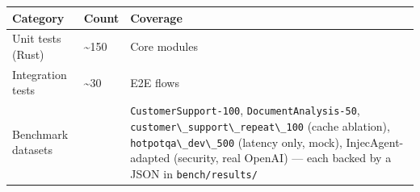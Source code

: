 \documentclass[
]{article}
\newcommand{\passthrough}[1]{#1}
\newcounter{none} %
\begin{document}
{\def\LTcaptype{none} %
\begin{longtable}[]{@{}
  >{\raggedright\arraybackslash}p{}
  >{\raggedright\arraybackslash}p{}
  >{\raggedright\arraybackslash}p{}@{}}
\toprule\noalign{}
\begin{minipage}[b]{\linewidth}\raggedright
Category
\end{minipage} & \begin{minipage}[b]{\linewidth}\raggedright
Count
\end{minipage} & \begin{minipage}[b]{\linewidth}\raggedright
Coverage
\end{minipage} \\
\midrule\noalign{}
\endhead
\bottomrule\noalign{}
\endlastfoot
Unit tests (Rust) & \textasciitilde150 & Core modules \\
Integration tests & \textasciitilde30 & E2E flows \\
Benchmark datasets & 5 & \passthrough{\lstinline!CustomerSupport-100!},
\passthrough{\lstinline!DocumentAnalysis-50!},
\passthrough{\lstinline!customer\_support\_repeat\_100!} (cache
ablation), \passthrough{\lstinline!hotpotqa\_dev\_500!} (latency only,
mock), InjecAgent-adapted (security, real OpenAI) --- each backed by a
JSON in \passthrough{\lstinline!bench/results/!} \\
\end{longtable}
}
\end{document}
